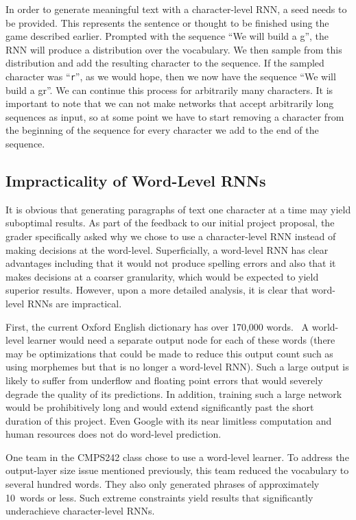 \documentclass{article}
\begin{document}
In order to generate meaningful text with a character-level RNN, a seed needs to be provided.  This represents the sentence or thought to be finished using the game described earlier. Prompted with the sequence ``We will build a g'', the RNN will produce a distribution over the vocabulary. We then sample from this distribution and add the resulting character to the sequence. If the sampled character was ``\texttt{r}'', as we would hope, then we now have the sequence ``We will build a gr''. We can continue this process for arbitrarily many characters. It is important to note that we can not make networks that accept arbitrarily long sequences as input, so at some point we have to start removing a character from the beginning of the sequence for every character we add to the end of the sequence.

\subsection{Impracticality of Word-Level RNNs}\label{sec:wordLevelRnn}

It is obvious that generating paragraphs of text one character at a time may yield suboptimal results.  As part of the feedback to our initial project proposal, the grader specifically asked why we chose to use a character-level RNN instead of making decisions at the word-level.  Superficially, a word-level RNN has clear advantages including that it would not produce spelling errors and also that it makes decisions at a coarser granularity, which would be expected to yield superior results.  However, upon a more detailed analysis, it is clear that word-level RNNs are impractical.

First, the current Oxford English dictionary has over 170,000 words.~\cite{oxfordWordCount} A world-level learner would need a separate output node for each of these words (there may be optimizations that could be made to reduce this output count such as using morphemes but that is no longer a word-level RNN).  Such a large output is likely to suffer from underflow and floating point errors that would severely degrade the quality of its predictions.  In addition, training such a large network would be prohibitively long and would extend significantly past the short duration of this project.  Even Google with its near limitless computation and human resources does not do word-level prediction.

One team in the CMPS242 class chose to use a word-level learner.  To address the output-layer size issue mentioned previously, this team reduced the vocabulary to several hundred words.  They also only generated phrases of approximately 10~words or less.  Such extreme constraints yield results that significantly underachieve character-level RNNs.
\end{document}
